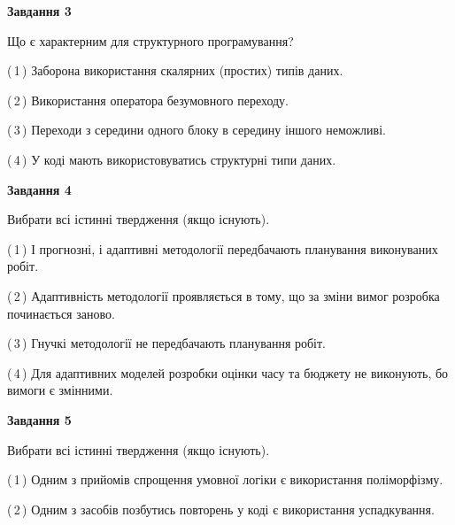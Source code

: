 \documentclass[10pt, ukrainian]{article}
\begin{document}
{\begin {large}
{\begin {center}\textbf{Завдання 3}\end {center}}\par
Що є характерним для структурного програмування?\par
\vspace{2mm}



(\,1\,) Заборона використання скалярних (простих) типів даних. %



(\,2\,) Використання оператора безумовного переходу. %



(\,3\,) Переходи з середини одного блоку в середину іншого неможливі. %



(\,4\,) У коді мають використовуватись структурні типи даних. %


{\begin {center}\textbf{Завдання 4}\end {center}}\par
Вибрати всі істинні твердження (якщо існують).\par
\vspace{2mm}



(\,1\,) І прогнозні, і адаптивні методології передбачають планування виконуваних робіт. %



(\,2\,) Адаптивність методології проявляється в тому, що за зміни вимог розробка починається заново. %



(\,3\,) Гнучкі методології не передбачають планування робіт. %



(\,4\,) Для адаптивних моделей розробки оцінки часу та бюджету не виконують, бо вимоги є змінними. %


{\begin {center}\textbf{Завдання 5}\end {center}}\par
Вибрати всі істинні твердження (якщо існують).\par
\vspace{2mm}



(\,1\,) Одним з прийомів спрощення умовної логіки є використання поліморфізму. %



(\,2\,) Одним з засобів позбутись повторень у коді є використання успадкування. %




\end{large}}
\end{document}
